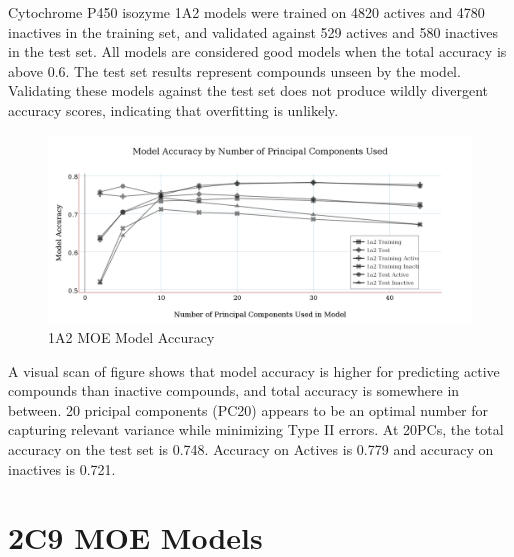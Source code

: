 Cytochrome P450 isozyme 1A2 models were trained on 4820 actives and 4780 inactives in the training set, and validated against 529 actives and 580 inactives in the test set. All models are considered good models when the total accuracy is above 0.6. The test set results represent compounds unseen by the model. Validating these models against the test set does not produce wildly divergent accuracy scores, indicating that overfitting is unlikely. 

\begin{figure}[!htbp]
\includegraphics[width=1\textwidth]{../img/1a2_moe_model_accuracy.png}
\caption{1A2 MOE Model Accuracy}
\end{figure}

A visual scan of figure shows that model accuracy is higher for predicting active compounds than inactive compounds, and total accuracy is somewhere in between. 20 pricipal components (PC20) appears to be an optimal number for capturing relevant variance while minimizing Type II errors. At 20PCs, the total accuracy on the test set is 0.748. Accuracy on Actives is 0.779 and accuracy on inactives is 0.721.

\section{2C9 MOE Models}


